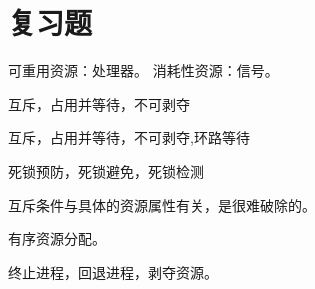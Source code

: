 
\section{复习题}
{
    \begin{reviewc}
        可重用资源：处理器。
        消耗性资源：信号。
    \end{reviewc}

    \begin{reviewc}
        互斥，占用并等待，不可剥夺
    \end{reviewc}

    \begin{reviewc}
        互斥，占用并等待，不可剥夺,环路等待
    \end{reviewc}

    \begin{reviewc}
        死锁预防，死锁避免，死锁检测
    \end{reviewc}

    \begin{reviewc}
        互斥条件与具体的资源属性有关，是很难破除的。
    \end{reviewc}

    \begin{reviewc}
        有序资源分配。
    \end{reviewc}

    \begin{reviewc}
        终止进程，回退进程，剥夺资源。
    \end{reviewc}
}
